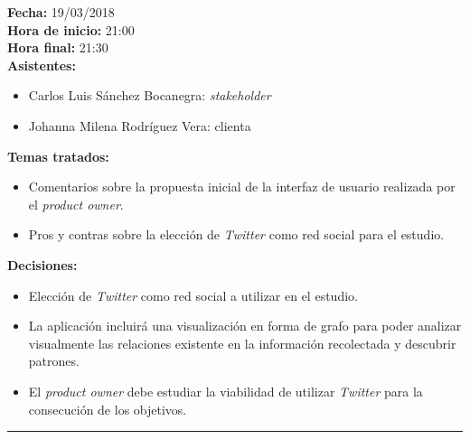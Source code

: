 \documentclass[11pt,a4paper]{article}
\begin{document}
\noindent\textbf{Fecha:} 19/03/2018
\\
\noindent\textbf{Hora de inicio:} 21:00
\\
\noindent\textbf{Hora final:} 21:30
\\
\noindent\textbf{Asistentes:} 
\begin{itemize}
\item Carlos Luis Sánchez Bocanegra: \textit{stakeholder}
\item Johanna Milena Rodríguez Vera: clienta
\end{itemize}
\noindent\textbf{Temas tratados:}
\begin{itemize}
\item Comentarios sobre la propuesta inicial de la interfaz de usuario realizada por el \textit{product owner}.
\item Pros y contras sobre la elección de \textit{Twitter} como red social para el estudio.
\end{itemize}
\noindent\textbf{Decisiones:}
\begin{itemize}
\item Elección de \textit{Twitter} como red social a utilizar en el estudio.
\item La aplicación incluirá una visualización en forma de grafo para poder analizar visualmente las relaciones existente en la información recolectada y descubrir patrones.
\item El \textit{product owner} debe estudiar la viabilidad de utilizar \textit{Twitter} para la consecución de los objetivos. 
\end{itemize}

\begin{center}\rule{10cm}{0.4pt}\end{center}
\end{document}

